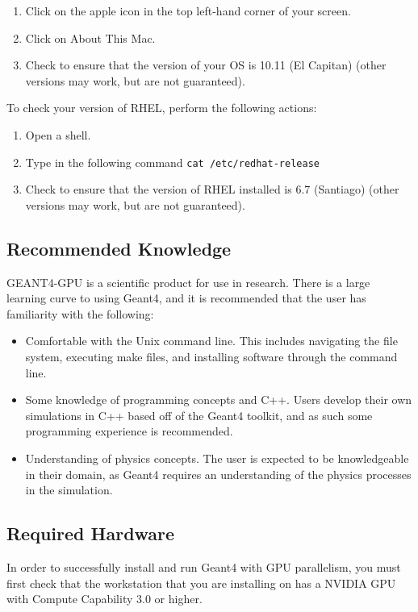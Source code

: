\documentclass[12pt]{article}
\begin{document}
\begin{enumerate}
\item Click on the apple icon in the top left-hand corner of your screen.
\item Click on About This Mac.
\item Check to ensure that the version of your OS is 10.11 (El Capitan) (other versions may work, but are not guaranteed).
\end{enumerate}

To check your version of RHEL, perform the following actions:
\begin{enumerate}
\item Open a shell.
\item Type in the following command \texttt{cat /etc/redhat-release}
\item Check to ensure that the version of RHEL installed is 6.7 (Santiago) (other versions may work, but are not guaranteed).
\end{enumerate}

\subsection{Recommended Knowledge} %
GEANT4-GPU is a scientific product for use in research. There is a large learning curve to using Geant4, and it is recommended that the user has familiarity with the following:
\begin{itemize}
\item Comfortable with the Unix command line. This includes navigating the file system, executing make files, and installing software through the command line.
\item Some knowledge of programming concepts and C++. Users develop their own simulations in C++ based off of the Geant4 toolkit, and as such some programming experience is recommended.
\item Understanding of physics concepts. The user is expected to be knowledgeable in their domain, as Geant4 requires an understanding of the physics processes in the simulation.
\end{itemize}

\subsection{Required Hardware} \label{SecCardReqs}%
In order to successfully install and run Geant4 with GPU parallelism, you must first check that the workstation that you are installing on has a NVIDIA GPU with Compute Capability 3.0 or higher.\\
\end{document}
